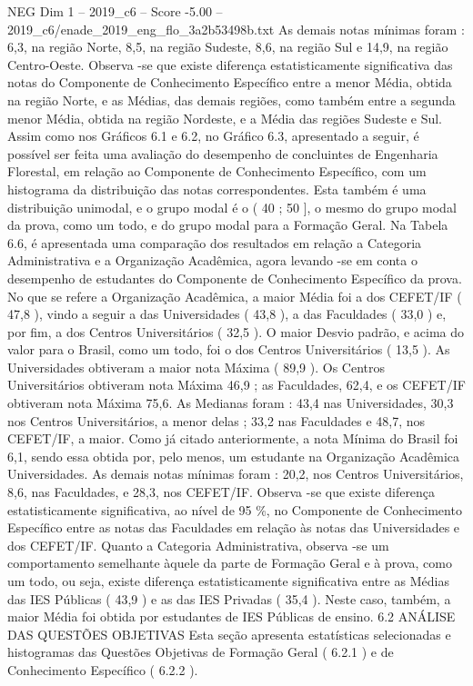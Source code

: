 \begin{textsample}{NEG Dim 1 – 2019\_c6 – Score -5.00 – 2019\_c6/enade\_2019\_eng\_flo\_3a2b53498b.txt}
As demais notas mínimas foram : 6,3, na região Norte, 8,5, na região Sudeste, 8,6, na região Sul e 14,9, na região Centro-Oeste.
Observa -se que existe diferença estatisticamente significativa das notas do Componente de Conhecimento Específico entre a menor Média, obtida na região Norte, e as Médias, das demais regiões, como também entre a segunda menor Média, obtida na região Nordeste, e a Média das regiões Sudeste e Sul.
Assim como nos Gráficos 6.1 e 6.2, no Gráfico 6.3, apresentado a seguir, é possível ser feita uma avaliação do desempenho de concluintes de Engenharia Florestal, em relação ao Componente de Conhecimento Específico, com um histograma da distribuição das notas correspondentes.
Esta também é uma distribuição unimodal, e o grupo modal é o ( 40 ; 50 ], o mesmo do grupo modal da prova, como um todo, e do grupo modal para a Formação Geral.
Na Tabela 6.6, é apresentada uma comparação dos resultados em relação a Categoria Administrativa e a Organização Acadêmica, agora levando -se em conta o desempenho de estudantes do Componente de Conhecimento Específico da prova.
No que se refere a Organização Acadêmica, a maior Média foi a dos CEFET/IF ( 47,8 ), vindo a seguir a das Universidades ( 43,8 ), a das Faculdades ( 33,0 ) e, por fim, a dos Centros Universitários ( 32,5 ).
O maior Desvio padrão, e acima do valor para o Brasil, como um todo, foi o dos Centros Universitários ( 13,5 ).
As Universidades obtiveram a maior nota Máxima ( 89,9 ).
Os Centros Universitários obtiveram nota Máxima 46,9 ; as Faculdades, 62,4, e os CEFET/IF obtiveram nota Máxima 75,6.
As Medianas foram : 43,4 nas Universidades, 30,3 nos Centros Universitários, a menor delas ; 33,2 nas Faculdades e 48,7, nos CEFET/IF, a maior.
Como já citado anteriormente, a nota Mínima do Brasil foi 6,1, sendo essa obtida por, pelo menos, um estudante na Organização Acadêmica Universidades.
As demais notas mínimas foram : 20,2, nos Centros Universitários, 8,6, nas Faculdades, e 28,3, nos CEFET/IF.
Observa -se que existe diferença estatisticamente significativa, ao nível de 95 \%, no Componente de Conhecimento Específico entre as notas das Faculdades em relação às notas das Universidades e dos CEFET/IF.
Quanto a Categoria Administrativa, observa -se um comportamento semelhante àquele da parte de Formação Geral e à prova, como um todo, ou seja, existe diferença estatisticamente significativa entre as Médias das IES Públicas ( 43,9 ) e as das IES Privadas ( 35,4 ).
Neste caso, também, a maior Média foi obtida por estudantes de IES Públicas de ensino. 6.2 ANÁLISE DAS QUESTÕES OBJETIVAS Esta seção apresenta estatísticas selecionadas e histogramas das Questões Objetivas de Formação Geral ( 6.2.1 ) e de Conhecimento Específico ( 6.2.2 ).

\end{textsample}

